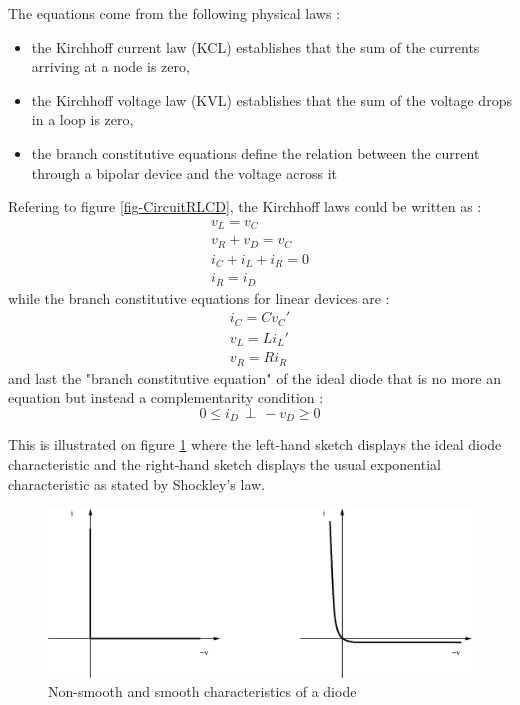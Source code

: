 \documentclass[10pt]{article}
\begin{document}
The equations come from the following physical laws :
\begin{itemize}
\item the Kirchhoff current law (KCL) establishes that the sum of the currents arriving at a node is zero,
\item the Kirchhoff voltage law (KVL) establishes that the sum of the voltage drops in a loop is zero,
\item the branch constitutive equations define the relation between the current through a bipolar device
and the voltage across it
\end{itemize}
Refering to figure \ref{fig-CircuitRLCD}, the Kirchhoff laws could be written as :
\[
\begin{array}{l}
v_L = v_C\\
v_R + v_D = v_C\\
i_C + i_L + i_R = 0\\
i_R = i_D
\end{array}
\]
while the branch constitutive equations for linear devices are :
\[
\begin{array}{l}
i_C = C v_C'\\
v_L = L i_L'\\
v_R = R i_R
\end{array}
\]
and last the "branch constitutive equation" of the ideal diode that is no more an equation but instead
a complementarity condition :
\[ 
0 \leq i_D \, \perp \, -v_D \geq 0
\]

This is illustrated on figure \ref{fig-diode-reg} where the left-hand sketch displays the ideal diode 
characteristic and the right-hand sketch displays the usual exponential characteristic as stated by
Shockley's law.

\begin{figure}[htp]
\begin{center}
\includegraphics[width=12cm]{diode-caract.eps}
\end{center}
\caption{Non-smooth and smooth characteristics of a diode}
\label{fig-diode-reg}
\end{figure}
\end{document}
